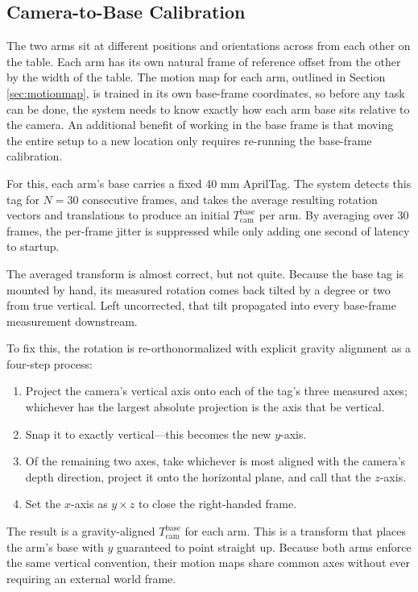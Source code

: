 \subsection{Camera-to-Base Calibration}
\label{sec:calib}
The two arms sit at different positions and orientations across from each other on the table. Each arm has its own natural frame of reference offset from the other by the width of the table. The motion map for each arm, outlined in Section \ref{sec:motionmap}, is trained in its own base-frame coordinates, so before any task can be done, the system needs to know exactly how each arm base sits relative to the camera. An additional benefit of working in the base frame is that moving the entire setup to a new location only requires re-running the base-frame calibration.

For this, each arm's base carries a fixed 40 mm AprilTag. The system detects this tag for $N{=}30$ consecutive frames, and takes the average resulting rotation vectors and translations to produce an initial $T_{\text{cam}}^{\text{base}}$ per arm. By averaging over 30 frames, the per-frame jitter is suppressed while only adding one second of latency to startup. 

The averaged transform is almost correct, but not quite. Because the base tag is mounted by hand, its measured rotation comes back tilted by a degree or two from true vertical. Left uncorrected, that tilt propagated into every base-frame measurement downstream.

To fix this, the rotation is re-orthonormalized with explicit gravity alignment as a four-step process:
  \begin{enumerate}
      \item Project the camera's vertical axis onto each of the tag's three measured axes; whichever has the largest absolute projection is the axis that be vertical.
      \item Snap it to exactly vertical---this becomes the new $y$-axis.              
      \item Of the remaining two axes, take whichever is most aligned with the camera's depth direction, project it onto the horizontal plane, and call that the $z$-axis.
      \item Set the $x$-axis as $y \times z$ to close the right-handed frame.         
  \end{enumerate}                                           

  The result is a gravity-aligned $T_{\text{cam}}^{\text{base}}$ for each arm. This is a transform that places the arm's base with $y$ guaranteed to point straight up. Because both arms enforce the same vertical convention, their motion maps share common axes without ever requiring an external world frame.

